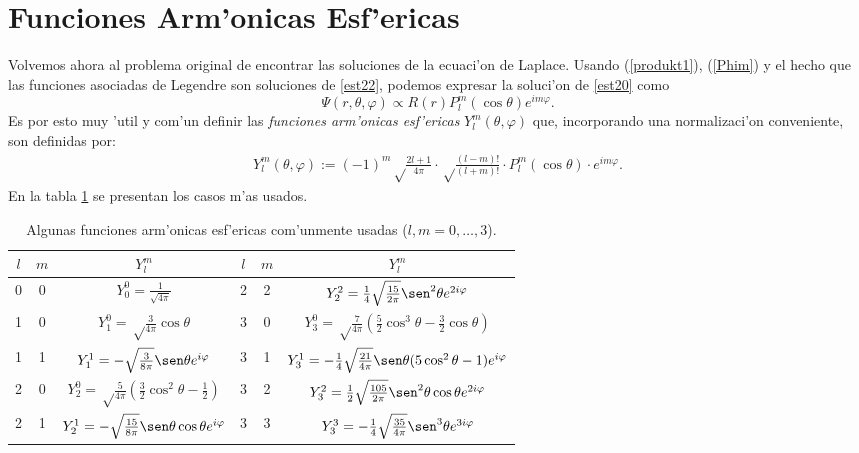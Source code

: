 \section{Funciones Arm'onicas Esf'ericas}

 Volvemos ahora al problema original de encontrar las soluciones de la ecuaci'on
de Laplace. Usando (\ref{produkt1}), (\ref{Phim}) y el hecho que las funciones asociadas de Legendre son soluciones de \eqref{est22}, podemos expresar la soluci'on de \eqref{est20} como
 \begin{equation}
\Psi(r,\theta,\varphi)\propto R(r)P_l^m(\cos\theta)e^{im\varphi}.\label{est30}
 \end{equation}
Es por esto muy 'util y com'un definir las \textit{funciones arm'onicas
esf'ericas} $Y_l^m (\theta,\varphi)$ que, incorporando una normalizaci'on conveniente, son definidas por:
 \begin{eqnarray}
  Y_l^m (\theta,\varphi) := (-1)^m\sqrt\frac{2l+1}{4\pi}\cdot\sqrt\frac
   {(l-m)!}{(l+m)!}\cdot P_l^m(\cos\theta)\cdot e^{im\varphi}.\label{kugel1}
 \end{eqnarray}
  En la tabla \ref{tabelle1} se presentan los casos m'as usados.
\begin{table}[htbp]
\begin{tabular}{cc|c||cc|c}
  $l$ & $m$ & $Y_l^m $ & $l$ & $m$ & $Y_l^m $\\\hline
  0&0&$Y_0^0=\frac 1{\sqrt{4\pi}}$&2&2&$Y_2^2=\frac 14\sqrt\frac{15}{2\pi}
   \sen^2\theta e^{2i\varphi}$\\
  1&0&$Y_1^0=\sqrt\frac 3{4\pi}\cos\theta$&3&0&$Y_3^0=\sqrt\frac 7{4\pi}
  (\frac 52\cos^3\theta-\frac 32\cos\theta)$\\
  1&1&$Y_1^1=-\sqrt \frac 3{8\pi}\sen\theta e^{i\varphi}$&3&1&$Y_3^1=
  -\frac 14\sqrt\frac{21}{4\pi}\sen\theta(5\cos^2\theta-1)e^{i\varphi}$\\
  2&0&$Y_2^0=\sqrt\frac 5{4\pi}(\frac 32\cos^2\theta-\frac 12)$&3&2&$Y_3^2=
  \frac 12\sqrt\frac{105}{2\pi}\sen^2\theta\cos\theta e^{2i\varphi}$\\
  2&1&$Y_2^1=-\sqrt\frac{15}{8\pi}\sen\theta\cos\theta e^{i\varphi}$&3&3&$
  Y_3^3=-\frac 14\sqrt\frac{35}{4\pi}\sen^3\theta e^{3i\varphi}$
 \end{tabular}
\caption{Algunas funciones arm'onicas esf'ericas com'unmente usadas
($l,m=0,\ldots,3$).}
\label{tabelle1}
\end{table}

